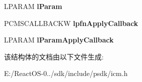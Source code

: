 \begin{DoxyCompactItemize}
L\+P\+A\+R\+AM {\bfseries l\+Param}
\item 
\mbox{\label{struct__tag_c_o_l_o_r_m_a_t_c_h_s_e_t_u_p_w_ab6783a17b5755c75c78f4bf210691f6b}} 
P\+C\+M\+S\+C\+A\+L\+L\+B\+A\+C\+KW {\bfseries lpfn\+Apply\+Callback}
\item 
\mbox{\label{struct__tag_c_o_l_o_r_m_a_t_c_h_s_e_t_u_p_w_a45799a0cc97fcf16b8bbca2a21d375fe}} 
L\+P\+A\+R\+AM {\bfseries l\+Param\+Apply\+Callback}
\end{DoxyCompactItemize}


该结构体的文档由以下文件生成\+:\begin{DoxyCompactItemize}
\item 
E\+:/\+React\+O\+S-\/0../sdk/include/psdk/icm.\+h\end{DoxyCompactItemize}
